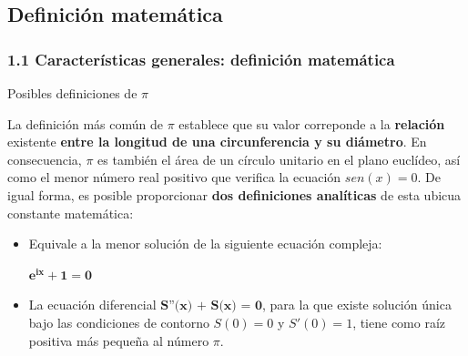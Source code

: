 \documentclass{beamer}
\begin{document}
\subsection{Definición matemática}
\begin{frame}
\frametitle{1.1 Características generales: definición matemática}
\begin{block}{Posibles definiciones de $\pi$}

La definición más común de $\pi$ establece que su valor correponde a la 
\textbf{relación} existente \textbf{entre la longitud de una circunferencia 
y su diámetro}. \pause En consecuencia, $\pi$ es también el área de un círculo 
unitario en el plano euclídeo, así como el menor número real positivo que 
verifica la ecuación $sen(x) = 0$. De igual forma, es posible proporcionar 
\textbf{dos definiciones analíticas} de esta ubicua constante matemática: \pause 

\begin{itemize}
    \item 
      Equivale a la menor solución de la siguiente ecuación compleja: 
      \begin{center}
      $\boldsymbol{e^{ix} + 1 = 0}$
      \end{center}
      \pause
    \item
      La ecuación diferencial $\textbf{S''(x) + S(x) = 0}$, para la que existe solución
      única bajo las condiciones de contorno $S(0) = 0$ y $S'(0) = 1$, tiene
      como raíz positiva más pequeña al número $\pi$.
\end{itemize}

\end{block}
\end{frame}

\end{document}
